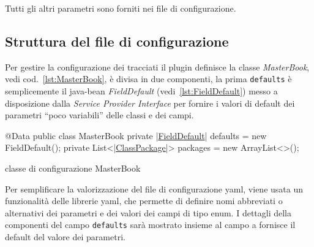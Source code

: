 \documentclass[a4paper,10pt]{report}
\newif\ifesource
\newenvironment{elisting}[1][!htb]
  {\captionsetup{aboveskip=0pt}\begin{listing}[#1]}
  {\end{listing}%
}
\begin{document}
Tutti gli altri parametri sono forniti nei file di configurazione.

\subsection{Struttura del file di configurazione}
Per gestire la configurazione dei tracciati il plugin definisce la classe
\textsl{MasterBook}, vedi cod.~\ref{lst:MasterBook}, è divisa in due componenti,
la prima \texttt{defaults} è semplicemente il java-bean \textsl{FieldDefault}
(vedi~\ref{lst:FieldDefault}) messo a disposizione dalla 
\textsl{Service Provider Interface} per fornire i valori di default dei 
parametri ``poco variabili'' delle classi e dei campi.

\ifesource
\begin{figure*}[!htb]
\begin{lstlisting}[language=java, caption=classe di configurazione MasterBook, 
label=lst:MasterBook]
@Data
public class MasterBook {
    private (*\hyperref[lst:FieldDefault]{FieldDefault}*) defaults = new FieldDefault();
    private List<(*\hyperref[lst:ClassPackage]{ClassPackage}*)> packages = new ArrayList<>();
}
\end{lstlisting}
\end{figure*}
\else
\begin{elisting}
\begin{javacode}
@Data
public class MasterBook {
    private |\hyperref[lst:FieldDefault]{FieldDefault}| defaults = new FieldDefault();
    private List<|\hyperref[lst:ClassPackage]{ClassPackage}|> packages = new ArrayList<>();
}
\end{javacode}
\caption{classe di configurazione MasterBook}
\label{lst:MasterBook}
\end{elisting}
\fi

Per semplificare la valorizzazione del file di configurazione yaml, viene usata
un funzionalità delle librerie yaml, che permette di definire nomi abbreviati o
alternativi dei parametri e dei valori dei campi di tipo enum.
I dettagli della componenti del campo \texttt{defaults} sarà mostrato insieme al
campo a fornisce il default del valore dei parametri.

\iffalse
\end{document}

